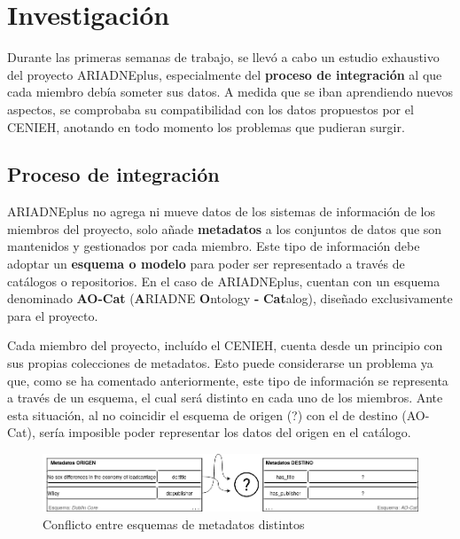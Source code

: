 \documentclass[
]{article}
\begin{document}
\hypertarget{investigaciuxf3n}{%
\section{Investigación}\label{investigaciuxf3n}}

Durante las primeras semanas de trabajo, se llevó a cabo un estudio
exhaustivo del proyecto ARIADNEplus, especialmente del \textbf{proceso
de integración} al que cada miembro debía someter sus datos. A medida
que se iban aprendiendo nuevos aspectos, se comprobaba su compatibilidad
con los datos propuestos por el CENIEH, anotando en todo momento los
problemas que pudieran surgir.

\hypertarget{proceso-de-integraciuxf3n}{%
\subsection{Proceso de integración}\label{proceso-de-integraciuxf3n}}

ARIADNEplus no agrega ni mueve datos de los sistemas de información de
los miembros del proyecto, solo añade \textbf{metadatos} a los conjuntos
de datos que son mantenidos y gestionados por cada miembro. Este tipo de
información debe adoptar un \textbf{esquema o modelo} para poder ser
representado a través de catálogos o repositorios. En el caso de
ARIADNEplus, cuentan con un esquema denominado \textbf{AO-Cat}
(\textbf{A}RIADNE \textbf{O}ntology \textbf{-} \textbf{Cat}alog),
diseñado exclusivamente para el proyecto.

Cada miembro del proyecto, incluído el CENIEH, cuenta desde un principio
con sus propias colecciones de metadatos. Esto puede considerarse un
problema ya que, como se ha comentado anteriormente, este tipo de
información se representa a través de un esquema, el cual será distinto
en cada uno de los miembros. Ante esta situación, al no coincidir el
esquema de origen (?) con el de destino (AO-Cat), sería imposible poder
representar los datos del origen en el catálogo.

\begin{figure}
\hypertarget{mappingProblem}{%
\centering
\includegraphics{../_static/images/mappingProblem.png}
\caption{Conflicto entre esquemas de metadatos
distintos}\label{mappingProblem}
}
\end{figure}
\end{document}
